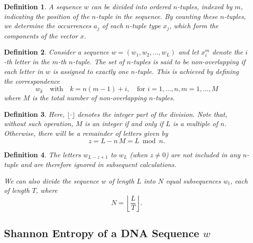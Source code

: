 \documentclass{article}
\newtheorem{Definition}{Definition}[section]
\theoremstyle{remark}
\begin{document}
\begin{Definition}\label{def:1.6}
A sequence \(w\) can be divided into ordered \(n\)-tuples, indexed by \(m\), indicating the position of the \(n\)-tuple in the sequence. By counting these \(n\)-tuples, we determine the occurrences \(a_j\) of each \(n\)-tuple type \(x_j\), which form the components of the vector \(x\).
\end{Definition}

\begin{Definition}\label{def:1.7.1}
Consider a sequence \(w = (w_1, w_2, \ldots, w_L)\) and let \(x_i^m\) denote the \(i\)-th letter in the \(m\)-th \(n\)-tuple. The set of \(n\)-tuples is said to be \emph{non-overlapping} if each letter in \(w\) is assigned to exactly one \(n\)-tuple. This is achieved by defining the correspondence
\begin{equation}
w_k \quad \text{with} \quad k = n(m-1) + i, \quad \text{for } i = 1,\dots,n, m = 1,\dots,M
\end{equation}
where \(M\) is the total number of non-overlapping \(n\)-tuples.
\end{Definition}

\begin{Definition}\label{def:1.8}
Here, \(\lfloor \cdot \rfloor\) denotes the integer part of the division. Note that, without such operation, \(M\) is an integer if and only if \(L\) is a multiple of \(n\). Otherwise, there will be a remainder of letters given by
\begin{equation}
z = L - n\,M = L \bmod n.
\end{equation}
\end{Definition}

\begin{Definition}\label{def:1.10}
The letters \(w_{L-z+1}\) to \(w_L\) (when \(z \neq 0\)) are not included in any \(n\)-tuple and are therefore ignored in subsequent calculations.

We can also divide the sequence \(w\) of length \(L\) into \(N\) equal subsequences\cite{ref21} \(w_t\), each of length \(T\), where 
\begin{equation}
N = \left\lfloor \frac{L}{T} \right\rfloor.
\end{equation}
\end{Definition}



\subsection{Shannon Entropy of a DNA Sequence \texorpdfstring{$w$}{w}}
\end{document}
